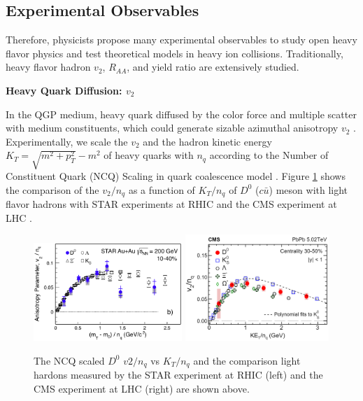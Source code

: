 \iffalse



\subsection{Experimental Observables}

Therefore, physicists propose many experimental observables to study open heavy flavor physics and test theoretical models in heavy ion collisions. Traditionally, heavy flavor hadron $v_2$, $R_{AA}$, and yield ratio are extensively studied. 

\textbf{Heavy Quark Diffusion: $v_2$}

In the QGP medium, heavy quark diffused by the color force and multiple scatter with medium constituents, which could generate sizable azimuthal anisotropy $v_2$ \cite{HQReview}. Experimentally, we scale the $v_2$ and the hadron kinetic energy $K_T = \sqrt{m^2 + p_T^2} - m^2$ of heavy quarks with $n_q$ according to the Number of Constituent Quark (NCQ) Scaling in quark coalescence model \cite{NCDScaling}. Figure \ref{HQV2} shows the comparison of the $v_2/n_q$ as a function of $K_T/n_q$ of $D^0$ ($c\bar u$) meson with light flavor hadrons with STAR experiments at RHIC \cite{STARD0v2} and the CMS experiment at LHC \cite{CMSD0v2}.


\begin{figure}[hbtp]
\begin{center}
\includegraphics[width=0.50\textwidth]{Figures/Chapter1/STARv2.png}
\includegraphics[width=0.485\textwidth]{Figures/Chapter1/CMSv2.png}
\caption{The NCQ scaled $D^0$ $v2/n_q$ vs $K_T/n_q$ and the comparison light hardons measured by the STAR experiment at RHIC (left) and the CMS experiment at LHC (right) are shown above.}
\label{HQV2}
\end{center}
\end{figure}   

